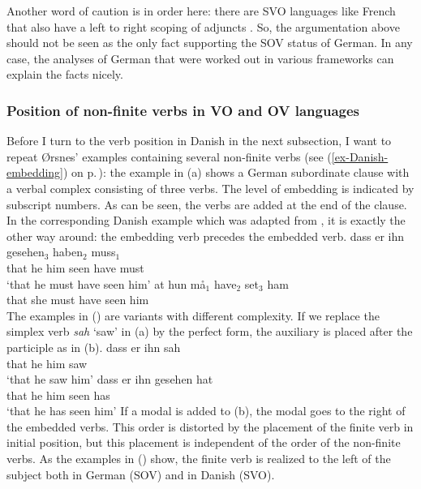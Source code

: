 Another word of caution is in order here: there are SVO languages like French that also have a left
to right scoping of adjuncts \citep[--161]{BGK2004a-u}. So, the argumentation above should not be seen as the only
fact supporting the SOV status of German. In any case, the analyses of German that were
worked out in various frameworks can explain the facts nicely.



\subsubsection{Position of non-finite verbs in VO and OV languages}

Before I turn to the verb position in Danish in the next subsection, I want to repeat Ørsnes'
examples containing several non-finite verbs (see (\ref{ex-Danish-embedding}) on p.\,\pageref{ex-Danish-embedding}): the example in (a) shows a German subordinate clause with a verbal complex consisting of
three verbs. The level of embedding is indicated by subscript numbers. As can be seen, the verbs are
added at the end of the clause. In the corresponding Danish example which was adapted from \citet[]{Oersnes2009b}, it is exactly the other way
around: the embedding verb precedes the embedded verb.
\eal
\ex
\gll dass er ihn gesehen$_3$ haben$_2$ muss$_1$\\
     that he him seen        have      must\\\german
\glt `that he must have seen him'
\ex
\gll at hun må$_1$ have$_2$ set$_3$ ham\\
     that she must have seen him\\\danish
\zl
%
The examples in () are variants with different complexity. If we replace the simplex verb
\emph{sah} `saw' in (a) by the perfect form, the auxiliary is placed after the participle as
in (b).
\eal
\ex
\gll dass er ihn sah\\
     that he him saw\\\german
\glt `that he saw him'
\ex
\gll dass er ihn gesehen hat\\
     that he him seen    has\\
\glt `that he has seen him'
\zl 
If a modal is added to (b), the modal goes to the right of the embedded verbs. This order is
distorted by the placement of the finite verb in initial position, but this placement is independent
of the order of the non-finite verbs. As the examples in () show, the finite verb is realized
to the left of the subject both in German (SOV) and in Danish (SVO).

